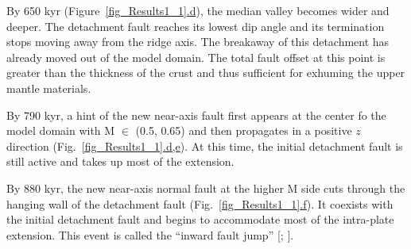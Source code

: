 By 650 kyr (Figure~\hyperref[fig_Results1_1]{\ref{fig_Results1_1}.d}), the median valley becomes wider and deeper. The detachment fault reaches its lowest dip angle and its termination stops moving away from the ridge axis. The breakaway of this detachment has already moved out of the model domain.
The total fault offset at this point is greater than the thickness of the crust and thus sufficient for exhuming the upper mantle materials. %

By 790 kyr, a hint of the new near-axis fault first appears at the center fo the model domain with M $\in$ (0.5, 0.65) and then propagates in a positive $z$ direction (Fig.~\hyperref[fig_Results1_1]{\ref{fig_Results1_1}.d,e}). At this time, the initial detachment fault is still active and takes up most of the extension. %

By 880 kyr, the new near-axis normal fault at the higher M side cuts through the hanging wall of the detachment fault (Fig.~\hyperref[fig_Results1_1]{\ref{fig_Results1_1}.f}). It coexists with the initial detachment fault and begins to accommodate most of the intra-plate extension. This event is called the ``inward fault jump'' [\citealp{Tucholke1998}; \citealp{Dick2008}].  %

